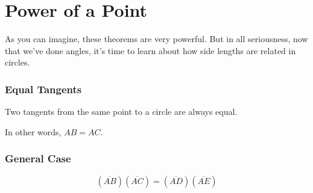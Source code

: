 \section{Power of a Point}
As you can imagine, these theorems are very powerful. But in all seriousness, now that we've done angles, it's time to learn about how side lengths are related in circles.

\subsubsection{Equal Tangents}
\begin{minipage}{0.6\textwidth}
\begin{center}
\end{center}
\end{minipage}
\begin{minipage}{0.35\textwidth}
\begin{theorem}
Two tangents from the same point to a circle are always equal.
\end{theorem}
In other words, $AB = AC$.
\end{minipage}

\subsubsection{General Case}
\begin{minipage}{0.6\textwidth}
\begin{center}
\end{center}
\end{minipage}
\begin{minipage}{0.35\textwidth}
$$(\overline{AB})(\overline{AC})=(\overline{AD})(\overline{AE})$$
\end{minipage}

